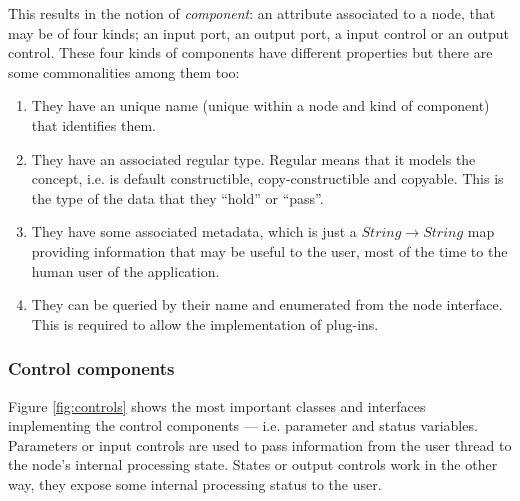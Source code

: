 This results in the notion of 
\emph{component}: an attribute associated to a node, that may be of
four kinds; an input port, an output port, a input control or an
output control. These four kinds of components have different
properties but there are some commonalities among them too:
\begin{enumerate}
\item They have an unique name (unique within a node and kind of
  component) that identifies them.
\item They have an associated regular type. Regular means that it
  models the  concept, i.e. is default constructible,
  copy-constructible and copyable. This is the type of the data that
  they ``hold'' or ``pass''.
\item They have some associated metadata, which is just a $String
  \rightarrow String$ map providing information that may be useful to
  the user, most of the time to the human user of the application.
\item They can be queried by their name and enumerated from the node
  interface. This is required to allow the implementation of plug-ins.
\end{enumerate}

\subsubsection{Control components}

Figure \ref{fig:controls} shows the most important
classes and interfaces implementing the control components ---
i.e. parameter and status variables. 
Parameters or input controls are used to pass information from the
user thread to the node's internal processing state. States or output
controls  work in the other way, they expose some
internal processing status to the user.

